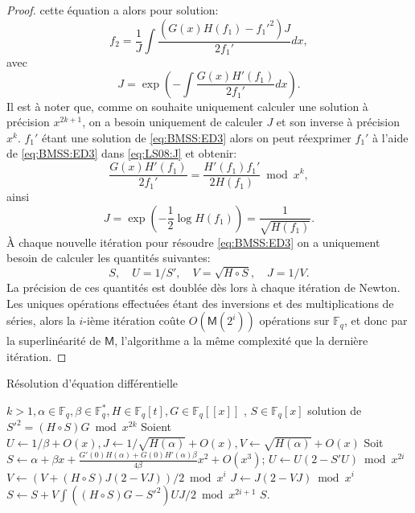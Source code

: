 \documentclass[10pt,a4paper]{book}
\theoremstyle{plain}
\theoremstyle{definition}
\theoremstyle{definition}
\theoremstyle{definition}
\theoremstyle{definition}
\theoremstyle{definition}
\theoremstyle{remark}
\theoremstyle{remark}
\theoremstyle{definition}
\begin{document}
\begin{proof}
 cette équation a alors pour solution:
\begin{equation}
f_2=\frac{1}{J}\int \frac{(G(x)H(f_1)-f_1'^2)J}{2f_1'} dx,
\end{equation}
avec 
\begin{equation}
\label{eq:LS08:J}
J=\exp \left( -\int \frac{G(x)H'(f_1)}{2f_1'}dx \right).
\end{equation}
Il est à noter que, comme on souhaite uniquement calculer une solution à précision $x^{2k+1}$, on a besoin uniquement de calculer $J$ et son inverse à précision $x^k$.
$f_1'$ étant une solution de \eqref{eq:BMSS:ED3} alors on peut réexprimer $f_1'$ à l'aide de \eqref{eq:BMSS:ED3} dans \eqref{eq:LS08:J} et obtenir:
\begin{equation}
\frac{G(x)H'(f_1)}{2f_1'}=\frac{H'(f_1)f_1'}{2H(f_1)} \bmod x^k,
\end{equation}
ainsi 
\begin{equation}
J=\exp \left(-\frac{1}{2}\log H(f_1) \right)= \frac{1}{\sqrt{H(f_1)}}.
\end{equation}
\`A chaque nouvelle itération pour résoudre \eqref{eq:BMSS:ED3} on a uniquement besoin de calculer les quantités suivantes:
\begin{equation}
S, \quad U=1/S', \quad V=\sqrt{H \circ S}, \quad J=1/V.
\end{equation}
La précision de ces quantités est doublée dès lors à chaque itération de 
Newton. Les uniques opérations effectuées étant des inversions et des 
multiplications de séries, alors la $i$-ième itération coûte 
$O(\mathsf{M}(2^i))$ opérations sur $\mathbb{F}_q$, et donc par la superlinéarité
de $\mathsf{M}$, l'algorithme a la même complexité que la dernière itération. 
\end{proof}


\begin{algorithm}
\caption{\label{alg:BMSS:eqdiff} Résolution d'équation différentielle}
\begin{algorithmic}[1]
\REQUIRE $k>1, \alpha \in \mathbb{F}_q, \beta \in \mathbb{F}_q^*, H \in \mathbb{F}_q[t], G \in \mathbb{F}_{q}[[x]]$ ,%
\ENSURE $S \in \mathbb{F}_q[x]$ solution de $S'^2=(H \circ S)G \bmod x^{2k}$
\STATE Soient $U \gets 1/\beta + O(x), J \gets 1/\sqrt{H(\alpha)}+O(x), V \gets \sqrt{H(\alpha)} + O(x)$
\STATE Soit $S \gets \alpha + \beta x + \frac{G'(0)H(\alpha)+G(0)H'(\alpha)\beta}{4\beta}x^2+O(x^3)$;
\STATE $U \gets U(2-S'U) \bmod x^{2i}$
\STATE $V \gets (V+(H \circ S)J(2-VJ))/2 \bmod x^{i}$
\STATE $J \gets J(2-VJ) \bmod {x^i}$
\STATE \label{alg:BMSS:eqdiff:int} $S \gets S+V \int ((H \circ S)G-S'^2)UJ/2 \bmod x^{2i+1}$
\ENDFOR
\RETURN$S$. 
\end{algorithmic}
\end{algorithm}
\end{document}
